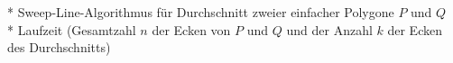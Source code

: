 * Sweep-Line-Algorithmus für Durchschnitt zweier einfacher Polygone $P$ und $Q$\\
* Laufzeit (Gesamtzahl $n$ der Ecken von $P$ und $Q$ und der Anzahl $k$ der Ecken des Durchschnitts)\\
